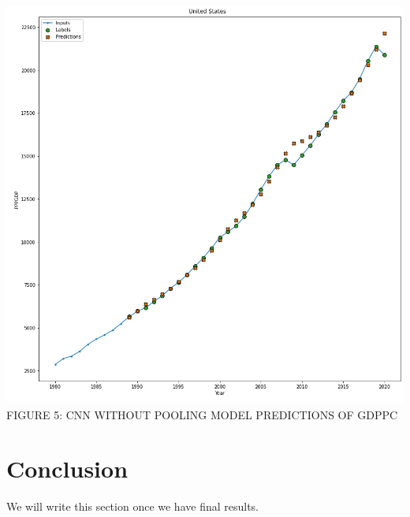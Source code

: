 \documentclass[final]{cvpr}
\begin{document}
\begin{center}
        \includegraphics[scale=0.27]{CNNFiller.png}
        {\small
            FIGURE 5: CNN WITHOUT POOLING MODEL PREDICTIONS OF GDPPC
        }
    \end{center}



\section{Conclusion}

We will write this section once we have final results.

\nocite{*}

{\small
    
    
}
\end{document}
